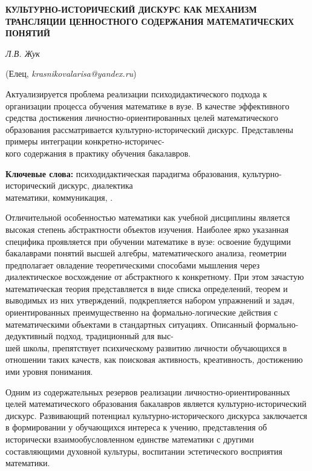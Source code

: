 

\begin{center}
    {\bf  КУЛЬТУРНО-ИСТОРИЧЕСКИЙ ДИСКУРС КАК МЕХАНИЗМ ТРАНСЛЯЦИИ ЦЕННОСТНОГО СОДЕРЖАНИЯ МАТЕМАТИЧЕСКИХ ПОНЯТИЙ}

    {\it Л.В. Жук}

    (Елец, {\it krasnikovalarisa@yandex.ru})
\end{center}




Актуализируется проблема реализации психодидактического подхода к организации процесса обучения математике в вузе. В качестве эффективного средства достижения личностно-ориентированных целей математического образования рассматривается культурно-исторический дискурс. Представлены примеры интеграции конкретно-историчес-\\кого содержания в практику обучения бакалавров.




{\bf Ключевые слова:} психодидактическая парадигма образования, культурно-исторический дискурс, диалектика \\математики, коммуника\-ция, .


Отличительной особенностью математики как учебной дисциплины является высокая степень абстрактности объектов изучения. Наиболее ярко указанная специфика проявляется при обучении математике в вузе: освоение будущими бакалаврами понятий высшей алгебры, математического анализа, геометрии предполагает овладение теоретическими способами мышления через диалектическое восхождение от абстрактного к конкретному. При этом зачастую математическая теория представляется в виде списка определений, теорем и выводимых из них утверждений, подкрепляется набором упражнений и задач, ориентированных преимущественно на формально-логические действия с математическими объектами в стандартных ситуациях. Описанный формально-дедуктивный подход, традиционный для выс-\\шей школы, препятствует психическому развитию личности обучающихся в отношении таких качеств, как поисковая активность, креативность, достижению ими уровня понимания.

Одним из содержательных резервов реализации лично\-стно-ориентированных целей математического образования бакалавров является культурно-исторический дискурс. Развивающий потенциал культурно-исторического дискурса заключается в формировании у обучающихся интереса к учению, представления об исторически взаимообусловленном единстве математики с другими составляющими духовной культуры, воспитании эстетического восприятия математики.

